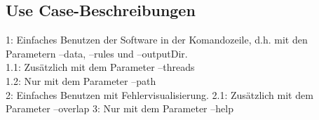 \subsection{Use Case-Beschreibungen}
1: Einfaches Benutzen der Software in der Komandozeile, d.h. mit den Parametern --data, --rules und --outputDir.\\
1.1: Zusätzlich mit dem Parameter --threads\\
1.2: Nur mit dem Parameter --path\\
2: Einfaches Benutzen mit Fehlervisualisierung.
2.1: Zusätzlich mit dem Parameter --overlap
3: Nur mit dem Parameter --help\\


